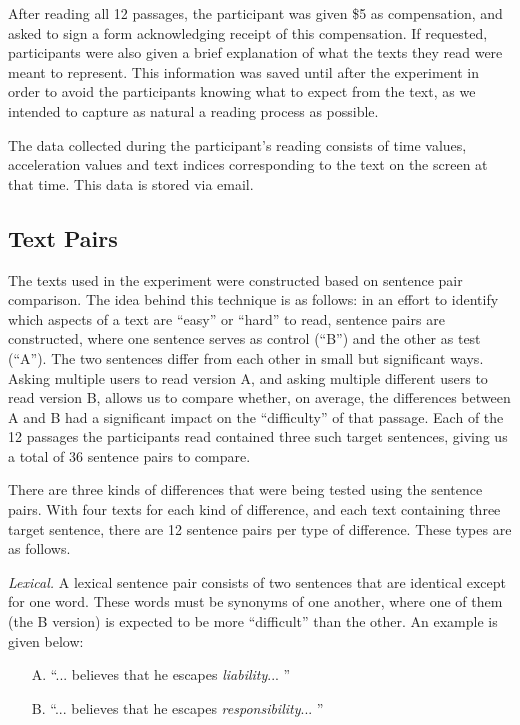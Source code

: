\documentclass[11pt,letterpaper]{article}
\begin{document}
	After reading all 12 passages, the participant was given \$5 as compensation, and asked to sign a form acknowledging receipt of this compensation. If requested, participants were also given a brief explanation of what the texts they read were meant to represent. This information was saved until after the experiment in order to avoid the participants knowing what to expect from the text, as we intended to capture as natural a reading process as possible.
	
	The data collected during the participant's reading consists of time values, acceleration values and text indices corresponding to the text on the screen at that time. This data is stored via email.
	
	\subsection{Text Pairs}
	
	The texts used in the experiment were constructed based on sentence pair comparison. The idea behind this technique is as follows: in an effort to identify which aspects of a text are ``easy'' or ``hard'' to read, sentence pairs are constructed, where one sentence serves as control (``B'') and the other as test (``A''). The two sentences differ from each other in small but significant ways. Asking multiple users to read version A, and asking multiple different users to read version B, allows us to compare whether, on average, the differences between A and B had a significant impact on the ``difficulty'' of that passage. Each of the 12 passages the participants read contained three such target sentences, giving us a total of 36 sentence pairs to compare.
	
	There are three kinds of differences that were being tested using the sentence pairs. With four texts for each kind of difference, and each text containing three target sentence, there are 12 sentence pairs per type of difference. These types are as follows.
	
	\textit{Lexical.} A lexical sentence pair consists of two sentences that are identical except for one word. These words must be synonyms of one another, where one of them (the B version) is expected to be more ``difficult'' than the other. An example is given below:
	\begin{itemize}[noitemsep, nolistsep]
		\item[A.] ``... believes that he escapes \textit{liability}... ''
		\item[B.] ``... believes that he escapes \textit{responsibility}... ''
	\end{itemize}
	
\end{document}
